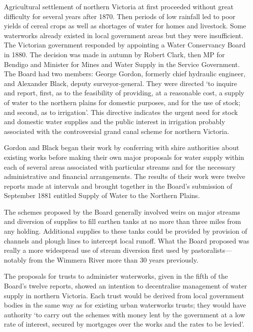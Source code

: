 Agricultural settlement of northern Victoria at first proceeded
without great difficulty for several years after 1870.  Then periods
of low rainfall led to poor yields of cereal crops as well as
shortages of water for homes and livestock.  Some waterworks already
existed in local government areas but they were insufficient.  The
Victorian government responded by appointing a Water Conservancy Board
in 1880.  The decision was made in autumn by Robert Clark, then MP for
Bendigo and Minister for Mines and Water Supply in the Service
Government.  The Board had two members: George Gordon, formerly chief
hydraulic engineer, and Alexander Black, deputy surveyor-general.
They were directed `to inquire and report, first, as to the
feasibility of providing, at a reasonable cost, a supply of water to
the northern plains for domestic purposes, and for the use of stock;
and second, as to irrigation'.
This directive indicates the urgent need for stock and domestic water
supplies and the public interest in irrigation probably associated
with the controversial grand canal scheme for northern Victoria.

Gordon and Black began their work by conferring with shire authorities
about existing works before making their own major proposals for water
supply within each of several areas associated with particular streams
and for the necessary administrative and financial arrangements.  The
results of their work were twelve reports made at intervals and
brought together in the Board's submission of September 1881 entitled
Supply of Water to the Northern Plains.

The schemes proposed by the Board generally involved weirs on major
streams and diversion of supplies to fill earthen tanks at no more
than three miles from any holding.
Additional supplies to these tanks could be provided by provision of
channels and plough lines to intercept local runoff.  What the Board
proposed was really a more widespread use of stream diversion first
used by pastoralists---notably from the Wimmera River more than 30
years previously.

The proposals for trusts to administer waterworks, given in the fifth
of the Board's twelve reports, showed an intention to decentralise
management of water supply in northern Victoria.  Each trust would be
derived from local government bodies in the same way as for existing
urban waterworks trusts; they would have authority `to carry out the
schemes with money lent by the government at a low rate of interest,
secured by mortgages over the works and the rates to be
levied'.

